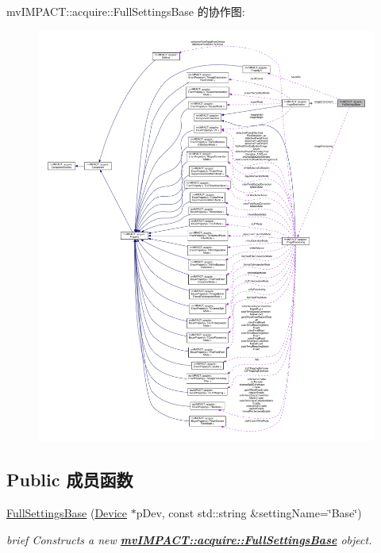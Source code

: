 mv\+I\+M\+P\+A\+C\+T\+:\+:acquire\+:\+:Full\+Settings\+Base 的协作图\+:
\nopagebreak
\begin{figure}[H]
\begin{center}
\leavevmode
\includegraphics[width=350pt]{classmv_i_m_p_a_c_t_1_1acquire_1_1_full_settings_base__coll__graph}
\end{center}
\end{figure}
\subsection*{Public 成员函数}
\begin{DoxyCompactItemize}
\item 
\hyperlink{classmv_i_m_p_a_c_t_1_1acquire_1_1_full_settings_base_a6f8eadfe847b03c9ed8b21dc9f7e6db9}{Full\+Settings\+Base} (\hyperlink{classmv_i_m_p_a_c_t_1_1acquire_1_1_device}{Device} $\ast$p\+Dev, const std\+::string \&setting\+Name=\char`\"{}Base\char`\"{})
\begin{DoxyCompactList}\small\item\em brief Constructs a new {\bfseries \hyperlink{classmv_i_m_p_a_c_t_1_1acquire_1_1_full_settings_base}{mv\+I\+M\+P\+A\+C\+T\+::acquire\+::\+Full\+Settings\+Base}} object. \end{DoxyCompactList}\end{DoxyCompactItemize}
